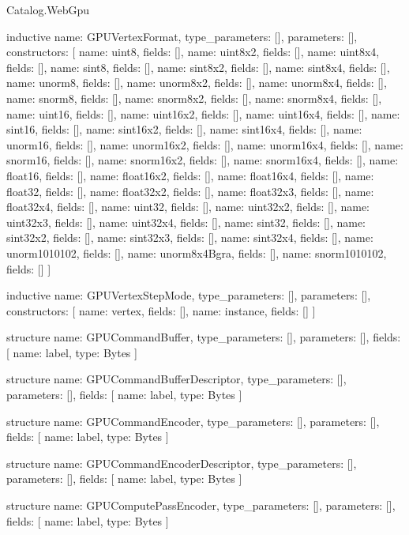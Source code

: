 \begin{lexlean}{Catalog.WebGpu}
\begin{semanticmodule}
inductive{
  name: GPUVertexFormat,
  type_parameters: [],
  parameters: [],
  constructors: [
    {name: uint8, fields: []},
    {name: uint8x2, fields: []},
    {name: uint8x4, fields: []},
    {name: sint8, fields: []},
    {name: sint8x2, fields: []},
    {name: sint8x4, fields: []},
    {name: unorm8, fields: []},
    {name: unorm8x2, fields: []},
    {name: unorm8x4, fields: []},
    {name: snorm8, fields: []},
    {name: snorm8x2, fields: []},
    {name: snorm8x4, fields: []},
    {name: uint16, fields: []},
    {name: uint16x2, fields: []},
    {name: uint16x4, fields: []},
    {name: sint16, fields: []},
    {name: sint16x2, fields: []},
    {name: sint16x4, fields: []},
    {name: unorm16, fields: []},
    {name: unorm16x2, fields: []},
    {name: unorm16x4, fields: []},
    {name: snorm16, fields: []},
    {name: snorm16x2, fields: []},
    {name: snorm16x4, fields: []},
    {name: float16, fields: []},
    {name: float16x2, fields: []},
    {name: float16x4, fields: []},
    {name: float32, fields: []},
    {name: float32x2, fields: []},
    {name: float32x3, fields: []},
    {name: float32x4, fields: []},
    {name: uint32, fields: []},
    {name: uint32x2, fields: []},
    {name: uint32x3, fields: []},
    {name: uint32x4, fields: []},
    {name: sint32, fields: []},
    {name: sint32x2, fields: []},
    {name: sint32x3, fields: []},
    {name: sint32x4, fields: []},
    {name: unorm1010102, fields: []},
    {name: unorm8x4Bgra, fields: []},
    {name: snorm1010102, fields: []}
  ]
}

inductive{
  name: GPUVertexStepMode,
  type_parameters: [],
  parameters: [],
  constructors: [
    {name: vertex, fields: []},
    {name: instance, fields: []}
  ]
}

structure{
  name: GPUCommandBuffer,
  type_parameters: [],
  parameters: [],
  fields: [
    {name: label, type: Bytes}
  ]
}

structure{
  name: GPUCommandBufferDescriptor,
  type_parameters: [],
  parameters: [],
  fields: [
    {name: label, type: Bytes}
  ]
}

structure{
  name: GPUCommandEncoder,
  type_parameters: [],
  parameters: [],
  fields: [
    {name: label, type: Bytes}
  ]
}

structure{
  name: GPUCommandEncoderDescriptor,
  type_parameters: [],
  parameters: [],
  fields: [
    {name: label, type: Bytes}
  ]
}

structure{
  name: GPUComputePassEncoder,
  type_parameters: [],
  parameters: [],
  fields: [
    {name: label, type: Bytes}
  ]
}


\end{semanticmodule}
\end{lexlean}
